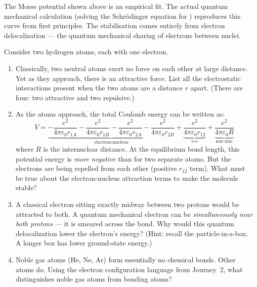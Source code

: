 \documentclass[12pt, a4paper]{book}
\begin{document}
The Morse potential shown above is an empirical fit.
The actual quantum mechanical calculation
(solving the Schr\"{o}dinger equation for )
reproduces this curve from first principles.
The stabilisation comes entirely from electron delocalization
--- the quantum mechanical sharing of electrons between nuclei.

\begin{puzzlebox}
Consider two hydrogen atoms, each with one electron.

\begin{enumerate}[label=(\alph*), leftmargin=*]
  \item Classically, two neutral atoms exert no force on
        each other at large distance.
        Yet as they approach, there is an attractive force.
        List all the electrostatic interactions present
        when the two atoms are a distance $r$ apart.
        (There are four: two attractive and two repulsive.)

  \item As the atoms approach, the total Coulomb energy
        can be written as:
        \[
          V = \underbrace{-\frac{e^2}{4\pi\varepsilon_0 r_{1A}}
                          -\frac{e^2}{4\pi\varepsilon_0 r_{1B}}
                          -\frac{e^2}{4\pi\varepsilon_0 r_{2A}}
                          -\frac{e^2}{4\pi\varepsilon_0 r_{2B}}}_{\text{electron-nucleus}}
              +\underbrace{\frac{e^2}{4\pi\varepsilon_0 r_{12}}}_{\text{e-e}}
              +\underbrace{\frac{e^2}{4\pi\varepsilon_0 R}}_{\text{nuc-nuc}}
        \]
        where $R$ is the internuclear distance.
        At the equilibrium bond length, this potential
        energy is \emph{more negative} than for two
        separate atoms.
        But the electrons are being repelled from each other
        (positive $r_{12}$ term).
        What must be true about the electron-nucleus
        attraction terms to make the molecule stable?

  \item A classical electron sitting exactly midway between
        two protons would be attracted to both.
        A quantum mechanical electron can be \emph{simultaneously
        near both protons} --- it is smeared across the bond.
        Why would this quantum delocalization lower
        the electron's energy?
        (Hint: recall the particle-in-a-box.
        A longer box has lower ground-state energy.)

  \item Noble gas atoms (He, Ne, Ar) form essentially
        no chemical bonds.
        Other atoms do.
        Using the electron configuration language from
        Journey~2, what distinguishes noble gas atoms
        from bonding atoms?
\end{enumerate}
\end{puzzlebox}
\end{document}
